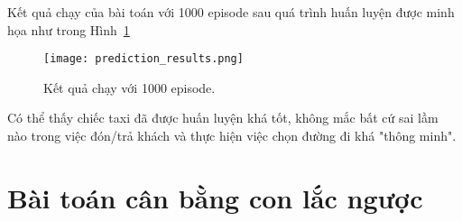Kết quả chạy của bài toán với 1000 episode
sau quá trình huấn luyện được minh họa như trong Hình~\ref{fig:prediction_results}

\begin{figure}[H]
    \centering
    \texttt{[image: prediction\_results.png]}
    \caption{Kết quả chạy với 1000 episode.}
    \label{fig:prediction_results}
\end{figure}

Có thể thấy chiếc taxi đã được huấn luyện khá tốt,
không mắc bất cứ sai lầm nào trong việc đón/trả khách
và thực hiện việc chọn đường đi khá "thông minh".


\section{Bài toán cân bằng con lắc ngược}

